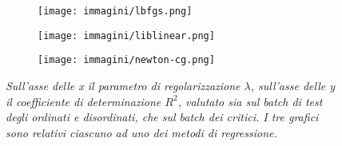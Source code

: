 \documentclass{article}
\begin{document}
\begin{figure}[H]
    \centering
    \begin{subfigure}{.35\textwidth}
       \centering
       \texttt{[image: immagini/lbfgs.png]}
    \end{subfigure}
    \begin{subfigure}{.35\textwidth}
       \centering
       \texttt{[image: immagini/liblinear.png]}
   \end{subfigure} 
   \begin{subfigure}{.35\textwidth}
    \centering
    \texttt{[image: immagini/newton-cg.png]}
    \end{subfigure} 
   \caption{\emph{Sull'asse delle x il parametro di regolarizzazione $\lambda$, sull'asse delle y il coefficiente di determinazione $R^2$, valutato sia sul batch di test degli ordinati e disordinati, che sul batch dei critici. I tre grafici sono relativi ciascuno ad uno dei metodi di regressione.}}
   \label{fig:performance}
\end{figure}
\end{document}
